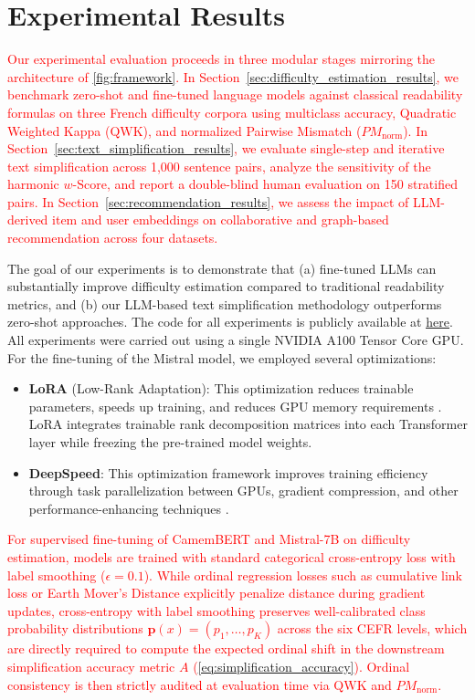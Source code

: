 \section{Experimental Results}\label{sec:experiments}

\textcolor{red}{Our experimental evaluation proceeds in three modular stages mirroring the architecture of \autoref{fig:framework}. In Section~\ref{sec:difficulty_estimation_results}, we benchmark zero-shot and fine-tuned language models against classical readability formulas on three French difficulty corpora using multiclass accuracy, Quadratic Weighted Kappa ($\text{QWK}$), and normalized Pairwise Mismatch ($PM_{\text{norm}}$). In Section~\ref{sec:text_simplification_results}, we evaluate single-step and iterative text simplification across 1,000 sentence pairs, analyze the sensitivity of the harmonic $w\text{-Score}$, and report a double-blind human evaluation on 150 stratified pairs. In Section~\ref{sec:recommendation_results}, we assess the impact of LLM-derived item and user embeddings on collaborative and graph-based recommendation across four datasets.}

The goal of our experiments is to demonstrate that (a) fine-tuned LLMs can substantially improve difficulty estimation compared to traditional readability metrics, and (b) our LLM-based text simplification methodology outperforms zero-shot approaches. The code for all experiments is publicly available at \href{https://github.com/hjamet/LLM-Difficulty-Based-Recommendation}{\underline{here}}. All experiments were carried out using a single NVIDIA A100 Tensor Core GPU. For the fine-tuning of the Mistral model, we employed several optimizations:

\begin{itemize}
    \item \textbf{LoRA} (Low-Rank Adaptation): This optimization reduces trainable parameters, speeds up training, and reduces GPU memory requirements \cite{hu2021loralowrankadaptationlarge}. LoRA integrates trainable rank decomposition matrices into each Transformer layer while freezing the pre-trained model weights.
    
    \item \textbf{DeepSpeed}: This optimization framework improves training efficiency through task parallelization between GPUs, gradient compression, and other performance-enhancing techniques \cite{10.1145/3394486.3406703}.
\end{itemize}

\textcolor{red}{For supervised fine-tuning of CamemBERT and Mistral-7B on difficulty estimation, models are trained with standard categorical cross-entropy loss with label smoothing ($\epsilon = 0.1$). While ordinal regression losses such as cumulative link loss or Earth Mover's Distance explicitly penalize distance during gradient updates, cross-entropy with label smoothing preserves well-calibrated class probability distributions $\mathbf{p}(x) = (p_1, \dots, p_K)$ across the six CEFR levels, which are directly required to compute the expected ordinal shift in the downstream simplification accuracy metric $A$ (\autoref{eq:simplification_accuracy}). Ordinal consistency is then strictly audited at evaluation time via $\text{QWK}$ and $PM_{\text{norm}}$.}


